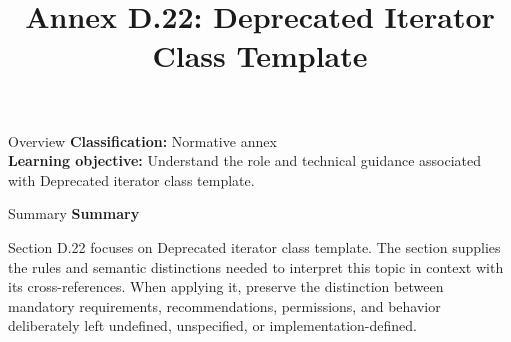 \documentclass[10pt,letterpaper]{article}
\title{Annex D.22: Deprecated Iterator Class Template}
\author{}
\date{}
\begin{document}
\maketitle
\begin{CornellOverviewBox}{Overview}
\textbf{Classification:} Normative annex\\[2pt]
\textbf{Learning objective:} Understand the role and technical guidance associated with Deprecated iterator class template.
\end{CornellOverviewBox}\begin{CornellSummaryBox}{Summary}
{\sffamily\bfseries\color{Accent} Summary}\par\vspace{3pt}Section D.22 focuses on Deprecated iterator class template. The section supplies the rules and semantic distinctions needed to interpret this topic in context with its cross-references. When applying it, preserve the distinction between mandatory requirements, recommendations, permissions, and behavior deliberately left undefined, unspecified, or implementation-defined.
\end{CornellSummaryBox}
\end{document}
